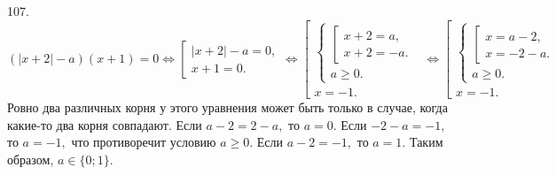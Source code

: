 107. $(|x+2|-a)(x+1)=0\Leftrightarrow \left[\begin{array}{l}|x+2|-a=0,\\ x+1=0.\end{array}\right.\Leftrightarrow
\left[\begin{array}{l}
\begin{cases}
\left[\begin{array}{l}
x+2=a,\\
x+2=-a.
\end{array}\right.\\
a\geqslant0.
\end{cases}\\
x=-1.
\end{array}\right.\Leftrightarrow
\left[\begin{array}{l}
\begin{cases}
\left[\begin{array}{l}
x=a-2,\\
x=-2-a.
\end{array}\right.\\
a\geqslant0.
\end{cases}\\
x=-1.
\end{array}\right.$
Ровно два различных корня у этого уравнения может быть только в случае, когда какие-то два корня совпадают. Если $a-2=2-a,$ то $a=0.$ Если $-2-a=-1,$ то $a=-1,$ что противоречит условию $a\geqslant0.$ Если $a-2=-1,$ то $a=1.$ Таким образом, $a\in\{0;1\}.$\\
